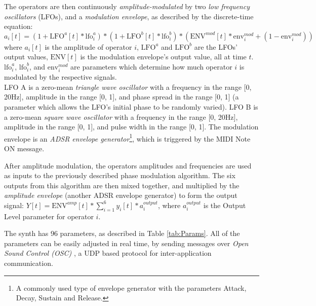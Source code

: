 \documentclass[11pt, oneside]{report}   	%
\begin{document}
The operators are then continuously \emph{amplitude-modulated} by two \emph{low frequency oscillators} (LFOs), and a \emph{modulation envelope}, as described by the discrete-time equation:
 \begin{equation}
a_i[t] = (1 + \mathrm{LFO}^a[t]*\mathrm{lfo}^{a}_i)*(1 + \mathrm{LFO}^b[t]*\mathrm{lfo}^{b}_i)*(\mathrm{ENV}^{mod}[t]*\mathrm{env}^{mod}_i + (1-\mathrm{env}^{mod}_i))
\end{equation}
where  $a_i[t]$ is the amplitude of operator $i$, $\mathrm{LFO}^a$ and $\mathrm{LFO}^b$ are the LFOs' output values, $\mathrm{ENV}[t]$ is the modulation envelope's output value, all at time $t$. $\mathrm{lfo}^{a}_i$, $\mathrm{lfo}^{b}_i$, and $\mathrm{env}^{mod}_{i}$ are parameters which determine how much operator $i$ is modulated by the respective signals. \\
LFO A is a zero-mean \emph{triangle wave oscillator} with a frequency in the range [0, 20\si{\hertz}], amplitude in the range [0, 1], and phase spread in the range [0, 1] (a parameter which allows the LFO's initial phase to be randomly varied). LFO B is a zero-mean \emph{square wave oscillator} with a frequency in the range [0, 20\si{\hertz}], amplitude in the range [0, 1], and pulse width in the range [0, 1]. The modulation envelope is an \emph{ADSR  envelope generator}\footnote{A commonly used type of envelope generator with the parameters Attack, Decay, Sustain and Release.}, which is triggered by the MIDI Note ON message.


After amplitude modulation, the operators amplitudes and frequencies are used as inputs to the previously described phase modulation algorithm. The six outputs from this algorithm are then mixed together, and multiplied by the \emph{amplitude envelope} (another ADSR envelope generator) to form the output signal: $Y[t] = \mathrm{ENV}^{amp}[t]*\sum_{i=1}^{6}y_i[t]*a_i^{output}$, where $a_i^{output}$ is the Output Level parameter for operator $i$.

The synth has 96 parameters, as described in Table \ref{tab:Params}. All of the parameters can be easily adjusted in real time, by sending messages over \emph{Open Sound Control (OSC)} \cite{OSC}, a UDP based protocol for inter-application communication.
\end{document}
